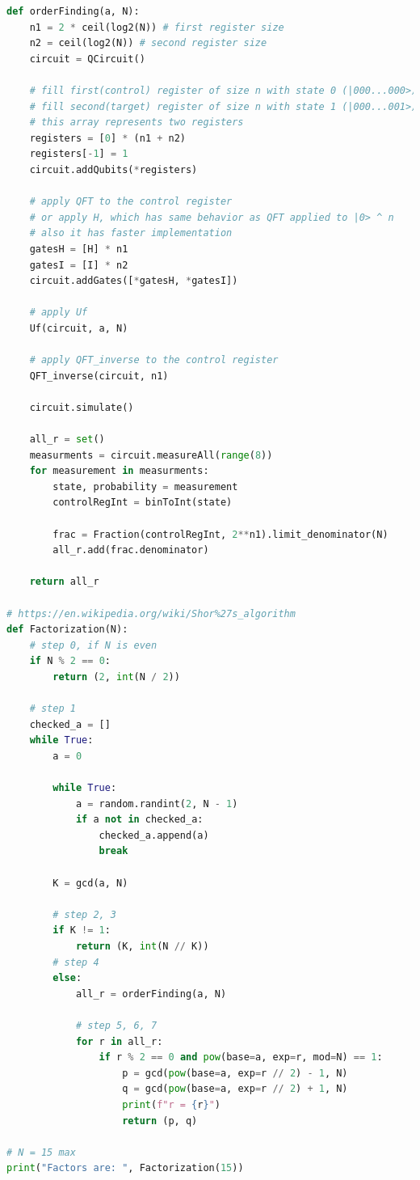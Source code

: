 \documentclass[11pt]{article}
\begin{document}
\begin{lstlisting}[language=Python, caption=Shor algorithm]
def orderFinding(a, N):
    n1 = 2 * ceil(log2(N)) # first register size
    n2 = ceil(log2(N)) # second register size
    circuit = QCircuit()

    # fill first(control) register of size n with state 0 (|000...000>)
    # fill second(target) register of size n with state 1 (|000...001>)
    # this array represents two registers
    registers = [0] * (n1 + n2)
    registers[-1] = 1
    circuit.addQubits(*registers)

    # apply QFT to the control register
    # or apply H, which has same behavior as QFT applied to |0> ^ n
    # also it has faster implementation
    gatesH = [H] * n1
    gatesI = [I] * n2
    circuit.addGates([*gatesH, *gatesI])

    # apply Uf
    Uf(circuit, a, N)

    # apply QFT_inverse to the control register
    QFT_inverse(circuit, n1)

    circuit.simulate()

    all_r = set()
    measurments = circuit.measureAll(range(8))
    for measurement in measurments:
        state, probability = measurement
        controlRegInt = binToInt(state)

        frac = Fraction(controlRegInt, 2**n1).limit_denominator(N)
        all_r.add(frac.denominator)
    
    return all_r

# https://en.wikipedia.org/wiki/Shor%27s_algorithm
def Factorization(N):
    # step 0, if N is even
    if N % 2 == 0:
        return (2, int(N / 2))

    # step 1
    checked_a = []
    while True:
        a = 0

        while True:
            a = random.randint(2, N - 1)
            if a not in checked_a:
                checked_a.append(a)
                break

        K = gcd(a, N)

        # step 2, 3
        if K != 1:
            return (K, int(N // K))
        # step 4
        else:
            all_r = orderFinding(a, N)

            # step 5, 6, 7 
            for r in all_r:
                if r % 2 == 0 and pow(base=a, exp=r, mod=N) == 1:
                    p = gcd(pow(base=a, exp=r // 2) - 1, N)
                    q = gcd(pow(base=a, exp=r // 2) + 1, N)
                    print(f"r = {r}")
                    return (p, q)

# N = 15 max
print("Factors are: ", Factorization(15))
\end{lstlisting}
\end{document}
